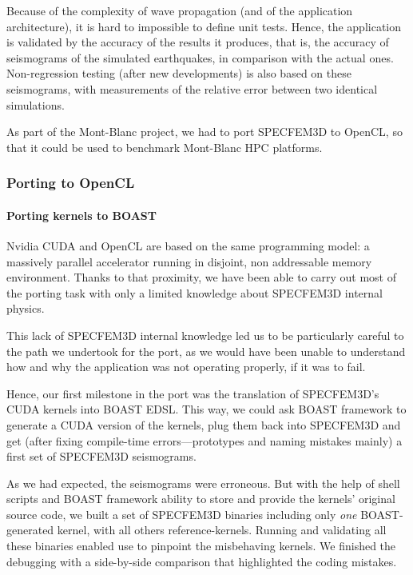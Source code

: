 \documentclass{IEEEtran}
\begin{document}
Because of the complexity of wave propagation (and of the application
architecture), it is hard to impossible to define unit tests. Hence,
the application is validated by the accuracy of the results it
produces, that is, the accuracy of seismograms of the simulated
earthquakes, in comparison with the actual ones. Non-regression
testing (after new developments) is also based on these seismograms,
with measurements of the relative error between two identical
simulations.

As part of the Mont-Blanc project, we had to port SPECFEM3D to OpenCL, so
that it could be used to benchmark Mont-Blanc HPC platforms.

\subsubsection{Porting to OpenCL}

\paragraph{Porting kernels to BOAST} 

Nvidia CUDA and OpenCL are based on the same programming model: a
massively parallel accelerator running in disjoint, non addressable
memory environment. Thanks to that proximity, we have been able to carry
out most of the porting task with only a limited knowledge about
SPECFEM3D internal physics.

This lack of SPECFEM3D internal knowledge led us to be particularly
careful to the path we undertook for the port, as we would have
been unable to understand how and why the application was not
operating properly, if it was to fail.

Hence, our first milestone in the port was the translation of
SPECFEM3D's CUDA kernels into BOAST EDSL. This way, we could ask BOAST
framework to generate a CUDA version of the kernels, plug them back
into SPECFEM3D and get (after fixing compile-time errors---prototypes
and naming mistakes mainly) a first set of SPECFEM3D seismograms.

As we had expected, the seismograms were erroneous. But with the help
of shell scripts and BOAST framework ability to store and provide the
kernels' original source code, we built a set of SPECFEM3D binaries
including only \emph{one} BOAST-generated kernel, with all others
reference-kernels. Running and validating all these binaries enabled
use to pinpoint the misbehaving kernels. We finished the debugging
with a side-by-side comparison that highlighted the coding mistakes.
\end{document}
